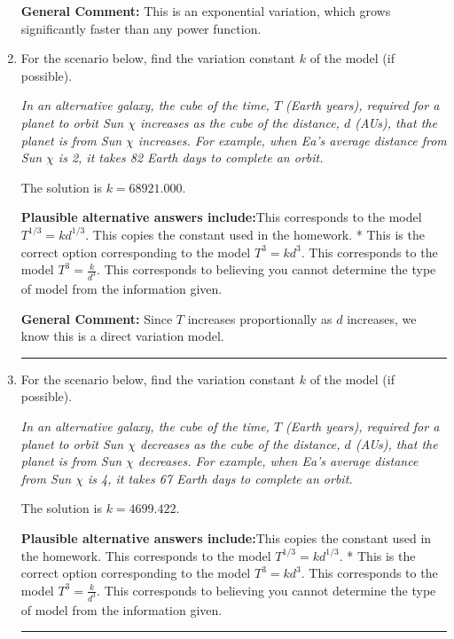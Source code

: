 \documentclass{extbook}[14pt]
\newcommand{\litem}[1]{\item #1

\rule{\textwidth}{0.4pt}}
\begin{document}
\begin{enumerate}
{\begin{enumerate}[label=\Alph*.]
\end{enumerate}

\textbf{General Comment:} This is an exponential variation, which grows significantly faster than any power function.
}
\litem{
For the scenario below, find the variation constant $k$ of the model (if possible).

\begin{center}
    \textit{ In an alternative galaxy, the cube of the time, $T$ (Earth years), required for a planet to orbit Sun $\chi$ increases as the cube of the distance, $d$ (AUs), that the planet is from Sun $\chi$ increases. For example, when Ea's average distance from Sun $\chi$ is 2, it takes 82 Earth days to complete an orbit. }
\end{center}
The solution is \( k = 68921.000 \).\begin{enumerate}[label=\Alph*.]
\textbf{Plausible alternative answers include:}This corresponds to the model $T^{1/3} = k d^{1/3}$.
This copies the constant used in the homework.
* This is the correct option corresponding to the model $T^{3} = k d^{3}$.
This corresponds to the model $T^{3} = \frac{k}{d^{3}}$.
This corresponds to believing you cannot determine the type of model from the information given.
\end{enumerate}

\textbf{General Comment:} Since $T$ increases proportionally as $d$ increases, we know this is a direct variation model.
}
\litem{
For the scenario below, find the variation constant $k$ of the model (if possible).

\begin{center}
    \textit{ In an alternative galaxy, the cube of the time, $T$ (Earth years), required for a planet to orbit Sun $\chi$ decreases as the cube of the distance, $d$ (AUs), that the planet is from Sun $\chi$ decreases. For example, when Ea's average distance from Sun $\chi$ is 4, it takes 67 Earth days to complete an orbit. }
\end{center}
The solution is \( k = 4699.422 \).\begin{enumerate}[label=\Alph*.]
\textbf{Plausible alternative answers include:}This copies the constant used in the homework.
This corresponds to the model $T^{1/3} = k d^{1/3}$.
* This is the correct option corresponding to the model $T^{3} = k d^{3}$.
This corresponds to the model $T^{3} = \frac{k}{d^{3}}$.
This corresponds to believing you cannot determine the type of model from the information given.
\end{enumerate}

}
\end{enumerate}
\end{document}
